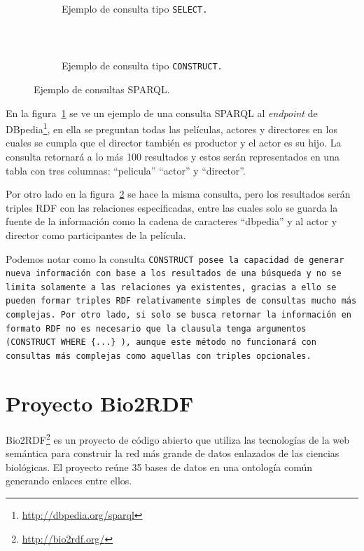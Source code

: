\begin{figure}[htpb]
  \centering
  \begin{subfigure}[b]{\textwidth}
    \centering
    \begin{tabular}{c}
      
    \end{tabular}
    \caption{Ejemplo de consulta tipo \tt{SELECT}.}
    \label{fig:sparql:select}
  \end{subfigure}
  \\[0.5cm]
  \begin{subfigure}[b]{\textwidth}
    \centering
    \begin{tabular}{c}
      
    \end{tabular}
    \caption{Ejemplo de consulta tipo \tt{CONSTRUCT}.}
    \label{fig:sparql:construct}
  \end{subfigure}
  \caption{Ejemplo de consultas SPARQL.}\label{fig:sparql}
\end{figure}

En la figura~\ref{fig:sparql:select} se ve un ejemplo de una consulta SPARQL al
\emph{endpoint} de DBpedia\footnote{\url{http://dbpedia.org/sparql}}, en ella se
preguntan todas las películas, actores y directores en los cuales se cumpla que
el director también es productor y el actor es su hijo. La consulta retornará a
lo más 100 resultados y estos serán representados en una tabla con tres
columnas: ``pelicula'' ``actor'' y ``director''.

Por otro lado en la figura~\ref{fig:sparql:construct} se hace la misma consulta,
pero los resultados serán triples RDF con las relaciones especificadas, entre
las cuales solo se guarda la fuente de la información como la cadena de
caracteres ``dbpedia'' y al actor y director como participantes de la película.

Podemos notar como la consulta \tt{CONSTRUCT} posee la capacidad de generar
nueva información con base a los resultados de una búsqueda y no se limita
solamente a las relaciones ya existentes, gracias a ello se pueden formar
triples RDF relativamente simples de consultas mucho más complejas. Por otro
lado, si solo se busca retornar la información en formato RDF no es necesario
que la clausula tenga argumentos (\tt{CONSTRUCT WHERE \{...\}} ), aunque este
método no funcionará con consultas más complejas como aquellas con triples
opcionales.

\section{Proyecto Bio2RDF}\label{ea:bio}
Bio2RDF\hspace{0.5mm}\footnote{\url{http://bio2rdf.org/}}
\cite{belleau2008bio2rdf,callahan2013bio2rdf} es un proyecto de código
abierto que utiliza las tecnologías de la web semántica para construir la
red más grande de datos enlazados de las ciencias biológicas.
El proyecto reúne 35 bases de datos en una ontología común generando enlaces
entre ellos.

